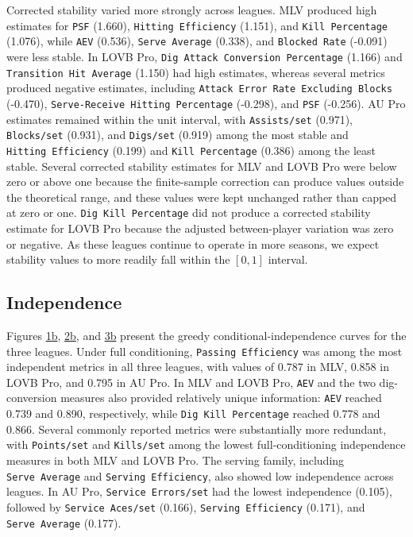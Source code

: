 \documentclass[
  12pt]{article}
\begin{document}
Corrected stability varied more strongly across leagues. MLV produced
high estimates for \texttt{PSF} (1.660), \texttt{Hitting\ Efficiency}
(1.151), and \texttt{Kill\ Percentage} (1.076), while \texttt{AEV}
(0.536), \texttt{Serve\ Average} (0.338), and \texttt{Blocked\ Rate}
(-0.091) were less stable. In LOVB Pro,
\texttt{Dig\ Attack\ Conversion\ Percentage} (1.166) and
\texttt{Transition\ Hit\ Average} (1.150) had high estimates, whereas
several metrics produced negative estimates, including
\texttt{Attack\ Error\ Rate\ Excluding\ Blocks} (-0.470),
\texttt{Serve-Receive\ Hitting\ Percentage} (-0.298), and \texttt{PSF}
(-0.256). AU Pro estimates remained within the unit interval, with
\texttt{Assists/set} (0.971), \texttt{Blocks/set} (0.931), and
\texttt{Digs/set} (0.919) among the most stable and
\texttt{Hitting\ Efficiency} (0.199) and \texttt{Kill\ Percentage}
(0.386) among the least stable. Several corrected stability estimates
for MLV and LOVB Pro were below zero or above one because the
finite-sample correction can produce values outside the theoretical
range, and these values were kept unchanged rather than capped at zero
or one. \texttt{Dig\ Kill\ Percentage} did not produce a corrected
stability estimate for LOVB Pro because the adjusted between-player
variation was zero or negative. As these leagues continue to operate in
more seasons, we expect stability values to more readily fall within the
\([0,1]\) interval.

\subsection{Independence}\label{independence-1}

Figures \hyperref[fig-meta-mlv]{1b}, \hyperref[fig-meta-lovb]{2b}, and
\hyperref[fig-meta-au]{3b} present the greedy conditional-independence
curves for the three leagues. Under full conditioning,
\texttt{Passing\ Efficiency} was among the most independent metrics in
all three leagues, with values of 0.787 in MLV, 0.858 in LOVB Pro, and
0.795 in AU Pro. In MLV and LOVB Pro, \texttt{AEV} and the two
dig-conversion measures also provided relatively unique information:
\texttt{AEV} reached 0.739 and 0.890, respectively, while
\texttt{Dig\ Kill\ Percentage} reached 0.778 and 0.866. Several commonly
reported metrics were substantially more redundant, with
\texttt{Points/set} and \texttt{Kills/set} among the lowest
full-conditioning independence measures in both MLV and LOVB Pro. The
serving family, including \texttt{Serve\ Average} and
\texttt{Serving\ Efficiency}, also showed low independence across
leagues. In AU Pro, \texttt{Service\ Errors/set} had the lowest
independence (0.105), followed by \texttt{Service\ Aces/set} (0.166),
\texttt{Serving\ Efficiency} (0.171), and \texttt{Serve\ Average}
(0.177).
\end{document}
